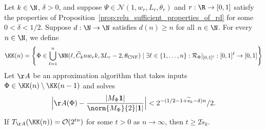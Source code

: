 \documentclass{amsart}[11pt]
\numberwithin{equation}{section}
\newcommand{\nn}{\mathcal{N}}
\newcommand{\realization}{\mathcal{R}}
\newcommand{\order}{\mathcal{O}}
\newcommand{\worstTime}{T}
\numberwithin{theorem}{section}
\begin{document}
    \begin{theorem}\label{thm:hardness_mvm}
        Let $k\in \N$, $\delta>0$, and suppose $\Psi \in \nn(1, w_r, L_r, \theta_r)$ and $r: \R \to [0, 1]$ satisfy the properties of Proposition~\ref{prop:relu_sufficient_properties_of_rd} for some $0 < \delta < 1/2$. Suppose $d: \N \to \N$ satisfies $d(n) \geq n$ for all $n \in \N$. For every $n \in \N$, we define 
        \begin{align}
            \KK(n) =  \left\{\Phi \in \bigcup_{\ell = 1}^n \NN(\ell ,\widetilde C_k n w_r k, 3L_r-2, \theta_{\rm{CNF}}) \mid \exists \ell \in \{1, \dots, n\}: \realization_\Phi|_{[0, 1]^\ell}: [0, 1]^\ell \to [0, 1]\right\}
        \end{align}
        Let $\AA$ be an approximation algorithm that takes inputs $\Phi \in \KK(n)\setminus\KK(n - 1)$ and solves
        \begin{align*}
            \Big|\AA(\Phi) - \frac{|M_{\Phi}\boldsymbol{1}|}{\norm{M_{\Phi}}{2}|\boldsymbol{1}|}\Big| < 2^{-(1/2-1+\widetilde s_k -\delta)n}/2.
        \end{align*}
        If $\worstTime_{\AA}(\KK(n)) = \order(2^{tn})$ for some $t>0$ as $n \to \infty$, then $t \geq 2\widetilde s_k$.
    \end{theorem} 
\end{document}
